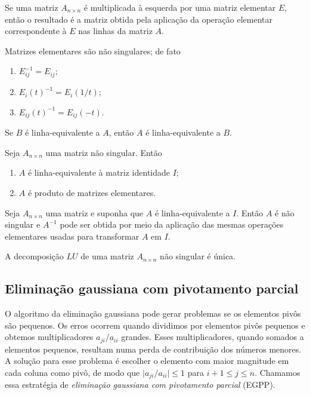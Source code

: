 \documentclass{article}
\begin{document}
\begin{prop}
    Se uma matriz \(A_{n \times n}\) é multiplicada à esquerda por uma matriz elementar \(E\), então o resultado é a matriz obtida pela aplicação da operação elementar correspondente à \(E\) nas linhas da matriz \(A\).
\end{prop}

\begin{prop}
    Matrizes elementares são não singulares; de fato
    \begin{enumerate}
        \item \(E_{ij}^{-1} = E_{ij}\);
        \item \(E_i(t)^{-1} = E_i(1/t)\);
        \item \(E_{ij}(t)^{-1} = E_{ij}(-t)\).
    \end{enumerate}
\end{prop}

\begin{prop}
    Se \(B\) é linha-equivalente a \(A\), então \(A\) é linha-equivalente a \(B\).
\end{prop}

\begin{prop}
    Seja \(A_{n \times n}\) uma matriz não singular. Então 
    \begin{enumerate}
        \item \(A\) é linha-equivalente à matriz identidade \(I\);
        \item \(A\) é produto de matrizes elementares.
    \end{enumerate}
\end{prop}

\begin{prop}
    Seja \(A_{n \times n}\) uma matriz e suponha que \(A\) é linha-equivalente a \(I\). Então \(A\) é não singular e \(A^{-1}\) pode ser obtida por meio da aplicação das mesmas operações elementares usadas para transformar \(A\) em \(I\).
\end{prop}

\begin{prop}
    A decomposição \(LU\) de uma matriz \(A_{n \times n}\) não singular é única.
\end{prop}

\subsection{Eliminação gaussiana com pivotamento parcial}

O algoritmo da eliminação gaussiana pode gerar problemas se os elementos pivôs são pequenos. Os erros ocorrem quando dividimos por elementos pivôs pequenos e obtemos multiplicadores \(a_{ji}/a_{ii}\) grandes. Esses multiplicadores, quando somados a elementos pequenos, resultam numa perda de contribuição dos números menores. 
A solução para esse problema é escolher o elemento com maior magnitude em cada coluna como pivô, de modo que \(\vert a_{ji}/a_{ii} \vert \leq 1\) para \(i+1\leq j\leq n\). Chamamos essa estratégia de \emph{eliminação gaussiana com pivotamento parcial} (EGPP).
\end{document}
